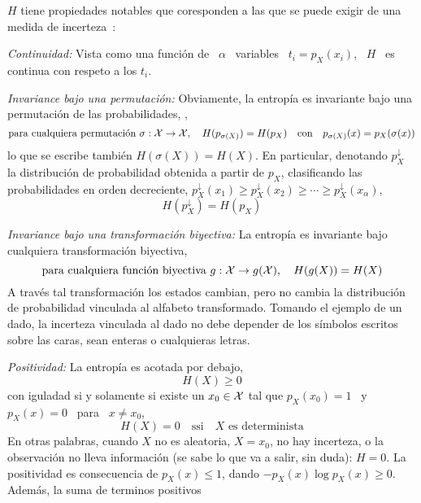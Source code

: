 $H$ tiene propiedades notables que coresponden  a las que se puede exigir de una
medida de incerteza~\cite{Sha48, ShaWea64, CovTho06, Rio07, DemCov91, Joh04}:
%
\begin{propiedades}
\item\label{prop:SZ:continuidad} {\it Continuidad:}  Vista como una funci\'on de
  \ $\alpha$ \ variables  \ $t_i = p_X(x_i)$, \ $H$ \  es continua con respeto a
  los $t_i$.
%
\setcounter{PropPermutacion}{\value{enumi}}
\item\label{prop:SZ:permutacion}   {\it  Invariance  bajo   una  permutaci\'on:}
  Obviamente,  la  entrop\'ia  es  invariante  bajo  una  permutaci\'on  de  las
  probabilidades, \ie,
  \[
  \mbox{para   cualquiera   permutaci\'on   }   \sigma:   \mathcal{X}   \to   \mathcal{X},   \quad
  H(p_{\sigma(X)})   =  H(p_X)   \quad  \mbox{con}   \quad   p_{\sigma(X)}(x)  =
  p_X(\sigma(x))
  \]
  lo que se  escribe tambi\'en $H(\sigma(X)) = H(X)$.   En particular, denotando
  $p_X^\downarrow$ la distribuci\'on de probabilidad obtenida a partir de $p_X$,
  clasificando las probabilidades en orden decreciente, $p_X^\downarrow(x_1) \ge
  p_X^\downarrow(x_2) \ge \cdots \ge p_X^\downarrow(x_\alpha)$,
  \[
  H(p_X^\downarrow) = H(p_X)
  \]
%
\setcounter{PropBiyeccion}{\value{enumi}}
\item\label{prop:SZ:biyeccion}   {\it  Invariance   bajo   una  transformaci\'on
    biyectiva:}  La entrop\'ia  es invariante  bajo  cualquiera transformaci\'on
  biyectiva, \ie
  \[
  \mbox{para cualquiera  funci\'on biyectiva } g:  \mathcal{X} \to g(\mathcal{X}),  \quad H(g(X)) =
  H(X)
  \]
  A  trav\'es  tal transformaci\'on  los  estados  cambian,  pero no  cambia  la
  distribuci\'on de probabilidad vinculada al alfabeto transformado.  Tomando el
  ejemplo de  un dado, la  incerteza vinculada al  dado no debe depender  de los
  s\'imbolos escritos sobre las caras, sean enteras o cualquieras letras.
%
\item\label{prop:SZ:positividad} {\it Positividad:} La entrop\'ia es acotada por
  debajo,
  \[
  H(X) \ge 0 
  \]
  con iguladad si y solamente si existe un $x_0 \in \mathcal{X}$ tal que $p_X(x_0) = 1$ \
  y \  $p_X(x) = 0$ \ para  \ $x \ne x_0$,
  \[
  H(X)  =  0 \quad  \mbox{ssi}  \quad X  \mbox{  es  determinista}
  \]
  En  otras  palabras, cuando  $X$  no  es aleatoria,  \ie  $X  =  x_0$, no  hay
  incerteza, o  la observaci\'on  no lleva  informaci\'on (se sabe  lo que  va a
  salir, sin duda): $H = 0$.   La positividad es consecuencia de $p_X(x) \le 1$,
  dando $- p_X(x)  \log p_X(x) \ge 0$.  Adem\'as, la  suma de terminos positivos

\end{propiedades}
